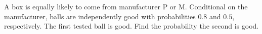 A box is equally likely to come from manufacturer P or M. Conditional on the manufacturer, balls are independently good with probabilities $0.8$ and $0.5$, respectively. The first tested ball is good. Find the probability the second is good.
